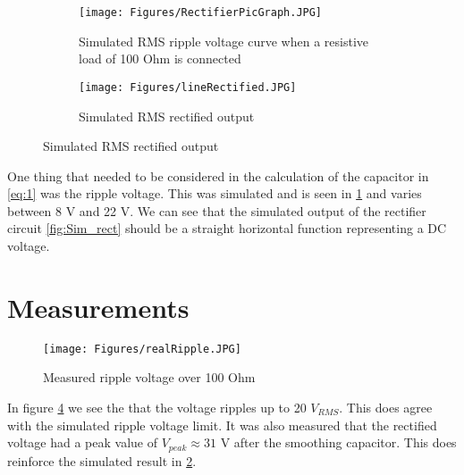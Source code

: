 \begin{figure}[H]
\centering
\begin{subfigure}{.5\textwidth}
  \centering
  \texttt{[image: Figures/RectifierPicGraph.JPG]}
  \caption{Simulated RMS ripple voltage curve when a resistive load of 100 Ohm is connected}
  \label{fig:sub1}
\end{subfigure}%
\begin{subfigure}{.5\textwidth}
  \centering
  \texttt{[image: Figures/lineRectified.JPG]}
  \caption{Simulated RMS rectified output}
  \label{fig:sub2}
\end{subfigure}
\label{fig:sim_rectified}
\end{figure}

One thing that needed to be considered in the calculation of the capacitor in \ref{eq:1} was the ripple voltage. This was simulated and is seen in \ref{fig:sub1} and varies between 8 V and 22 V. We can see that the simulated output of the rectifier circuit \ref{fig:Sim_rect} should be a straight horizontal function representing a DC voltage.

\section{Measurements} \label{sec:measurements_rectifier}

\begin{minipage}{0.5\textwidth}
\begin{figure}[H]
\texttt{[image: Figures/realRipple.JPG]}
\centering
\caption{Measured ripple voltage over 100 Ohm}
\label{fig:measured ripple}
\end{figure}
\end{minipage} \hfill
\begin{minipage}{0.45\textwidth}
In figure \ref{fig:measured ripple} we see the that the voltage ripples up to 20 $V_{RMS}$. This does agree with the simulated ripple voltage limit. It was also measured that the rectified voltage had a peak value of $V_{peak} \approx 31 \text{ V}$ after the smoothing capacitor. This does reinforce the simulated result in \ref{fig:sub2}.
\end{minipage}



